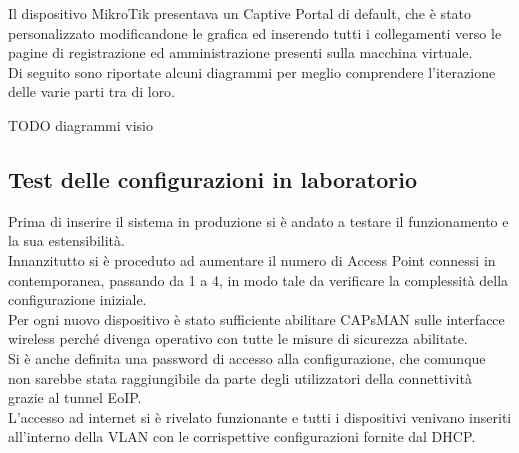 \documentclass[Realizzazione.tex]{subfiles}
\begin{document}
Il dispositivo MikroTik presentava un Captive Portal di default, che è stato personalizzato modificandone le grafica ed inserendo tutti i collegamenti verso le pagine di registrazione ed amministrazione presenti sulla macchina virtuale. \\

Di seguito sono riportate alcuni diagrammi per meglio comprendere l'iterazione delle varie parti tra di loro.

TODO diagrammi visio

\subsection{Test delle configurazioni in laboratorio} 
Prima di inserire il sistema in produzione si è andato a testare il funzionamento e la sua estensibilità. \\
Innanzitutto si è proceduto ad aumentare il numero di Access Point connessi in contemporanea, passando da 1 a 4, in modo tale da verificare la complessità della configurazione iniziale. \\
Per ogni nuovo dispositivo è stato sufficiente abilitare CAPsMAN sulle interfacce wireless perché divenga operativo con tutte le misure di sicurezza abilitate. \\
Si è anche definita una password di accesso alla configurazione, che comunque non sarebbe stata raggiungibile da parte degli utilizzatori della connettività grazie al tunnel EoIP. \\
L'accesso ad internet si è rivelato funzionante e tutti i dispositivi venivano inseriti all'interno della  VLAN con le corrispettive configurazioni fornite dal DHCP.
\end{document}
